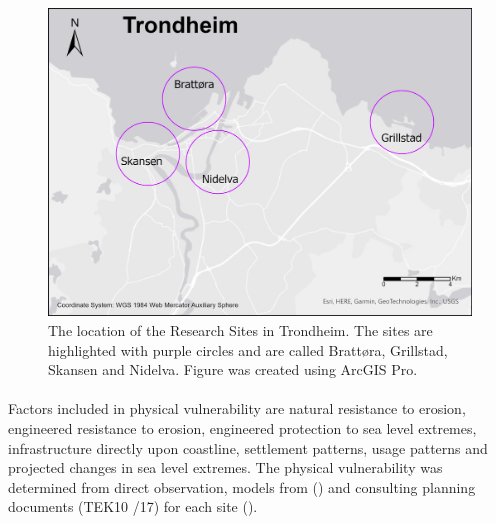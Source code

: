 \begin{figure} [h]
    \centering
    \includegraphics[width=1.0\textwidth]{fig/trondheim_research_sites_grey_circles.png}
    \caption{ The location of the Research Sites in Trondheim. The sites are highlighted with purple circles and are called Brattøra, Grillstad, Skansen and Nidelva. Figure was created using ArcGIS Pro.}
    \label{fig:research sites}
\end{figure}

\paragraph{}

Factors included in physical vulnerability are natural resistance to erosion, engineered resistance to erosion, engineered protection to sea level extremes, infrastructure directly upon coastline, settlement patterns, usage patterns and projected changes in sea level extremes. The physical vulnerability was determined from direct observation,  models from (\cite{kartverket_se_2020}) and consulting planning documents (TEK10 /17) for each site (\cite{miljoenheten_og_byplankontoret_trondheim_kommune_9-notat-om-havnivastigning-og-stormflo---hensyn-i-arealplanlegging-nyhavnapdf_2020}). 


